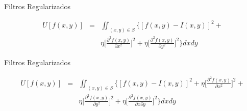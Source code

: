 \documentclass[]{beamer}
\begin{document}
\begin{frame}{Filtros Regularizados}

\begin{eqnarray}
  U[f(x,y)] &=&\iint_{(x,y) \in S} \Bigg\{ [f(x,y)-I(x,y)]^2 +  \nonumber \\
     & & \eta \bigg[  \frac{\partial ^2 f(x,y)}{\partial x^2} \bigg]^2 +
            \eta \bigg[  \frac{\partial ^2 f(x,y)}{\partial y^2} \bigg]^2 
     \Bigg\} dx dy
\end{eqnarray}

\end{frame}

\begin{frame}{Filtros Regularizados}

\begin{eqnarray}
  U[f(x,y)] &=&\iint_{(x,y) \in S} \Bigg\{ [f(x,y)-I(x,y)]^2 + 
     \eta \bigg[  \frac{\partial ^2 f(x,y)}{\partial x^2} \bigg]^2 +
                \nonumber \\
      & &\eta \bigg[  \frac{\partial ^2 f(x,y)}{\partial y^2} \bigg]^2 +
     \eta \bigg[  \frac{\partial ^2 f(x,y)}{\partial x \partial y} \bigg]^2
     \Bigg\} dx dy
\end{eqnarray}

\end{frame}
\end{document}
